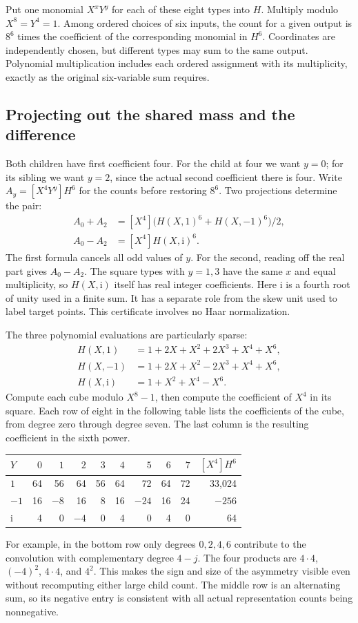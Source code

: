 \documentclass[12pt,letterpaper]{article}
\begin{document}
Put one monomial $X^xY^y$ for each of these eight types into $H$. Multiply modulo $X^8=Y^4=1$. Among ordered choices of six inputs, the count for a given output is $8^6$ times the coefficient of the corresponding monomial in $H^6$. Coordinates are independently chosen, but different types may sum to the same output. Polynomial multiplication includes each ordered assignment with its multiplicity, exactly as the original six-variable sum requires.

\subsection{Projecting out the shared mass and the difference}
Both children have first coefficient four. For the child at four we want $y=0$; for its sibling we want $y=2$, since the actual second coefficient there is four. Write $A_y=[X^4Y^y]H^6$ for the counts before restoring $8^6$. Two projections determine the pair:
\begin{align*}
 A_0+A_2&=[X^4]\big(H(X,1)^6+H(X,-1)^6\big)/2,\\
 A_0-A_2&=[X^4]H(X,\mathrm{i})^6 .
\end{align*}
The first formula cancels all odd values of $y$. For the second, reading off the real part gives $A_0-A_2$. The square types with $y=1,3$ have the same $x$ and equal multiplicity, so $H(X,\mathrm{i})$ itself has real integer coefficients. Here $\mathrm{i}$ is a fourth root of unity used in a finite sum. It has a separate role from the skew unit used to label target points. This certificate involves no Haar normalization.

The three polynomial evaluations are particularly sparse:
\begin{align*}
H(X,1)&=1+2X+X^2+2X^3+X^4+X^6,\\
H(X,-1)&=1+2X+X^2-2X^3+X^4+X^6,\\
H(X,\mathrm{i})&=1+X^2+X^4-X^6 .
\end{align*}
Compute each cube modulo $X^8-1$, then compute the coefficient of $X^4$ in its square. Each row of eight in the following table lists the coefficients of the cube, from degree zero through degree seven. The last column is the resulting coefficient in the sixth power.
\begin{center}\small\begin{tabular}{@{}lrrrrrrrrr@{}}\toprule
$Y$ & $0$ & $1$ & $2$ & $3$ & $4$ & $5$ & $6$ & $7$ & $[X^4]H^6$\\\midrule
$1$ &64&56&64&56&64&72&64&72&33,024\\
$-1$ &16&$-8$&16&8&16&$-24$&16&24&$-256$\\
$\mathrm{i}$ &4&0&$-4$&0&4&0&4&0&64\\\bottomrule
\end{tabular}\end{center}
For example, in the bottom row only degrees $0,2,4,6$ contribute to the convolution with complementary degree $4-j$. The four products are $4\cdot4$, $(-4)^2$, $4\cdot4$, and $4^2$. This makes the sign and size of the asymmetry visible even without recomputing either large child count. The middle row is an alternating sum, so its negative entry is consistent with all actual representation counts being nonnegative.
\end{document}
